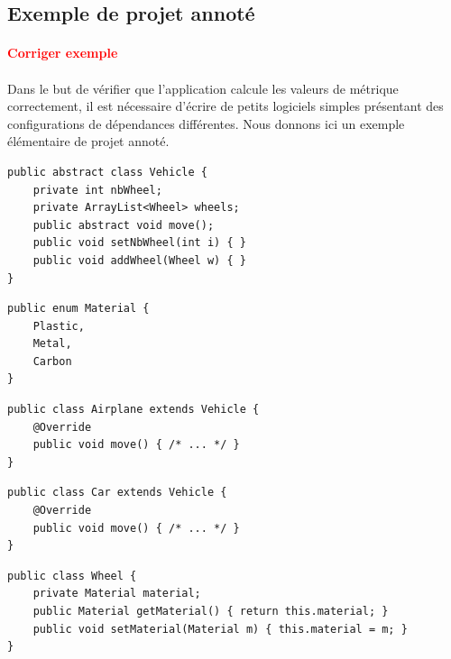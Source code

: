 \documentclass{scrartcl}
\newcommand{\TODO}[1] {
    \noindent \paragraph{\textcolor{red}{#1}}
}
\begin{document}
\newpage
\begin{appendices}


\section{Exemple de projet annoté}
\TODO{Corriger exemple}
    \paragraph{}Dans le but de vérifier que l'application calcule les valeurs de métrique correctement, il est nécessaire d'écrire de petits logiciels simples présentant des configurations de dépendances différentes. Nous donnons ici un exemple élémentaire de projet annoté.
    
\begin{minipage}{7.5cm}
\begin{lstlisting}[caption=Classe Vehicle]
public abstract class Vehicle {
    private int nbWheel;
    private ArrayList<Wheel> wheels;
    public abstract void move();
    public void setNbWheel(int i) { }
    public void addWheel(Wheel w) { }
}
\end{lstlisting}
\end{minipage}
\hspace{0.5cm}
\begin{minipage}{6cm}
\begin{lstlisting}[caption=Enumeration Material]
public enum Material {
    Plastic,
    Metal,
    Carbon
}
\end{lstlisting}
\end{minipage}
\vspace{0.5cm}
\begin{lstlisting}[caption=Classe Airplane]
public class Airplane extends Vehicle {
    @Override
    public void move() { /* ... */ }
}
\end{lstlisting}
\begin{lstlisting}[caption=Classe Car]
public class Car extends Vehicle {
    @Override
    public void move() { /* ... */ }
}
\end{lstlisting}
\begin{lstlisting}[caption=Classe Wheel]
public class Wheel {
    private Material material;
    public Material getMaterial() { return this.material; }
    public void setMaterial(Material m) { this.material = m; }
}
\end{lstlisting}




\end{appendices}
\end{document}
